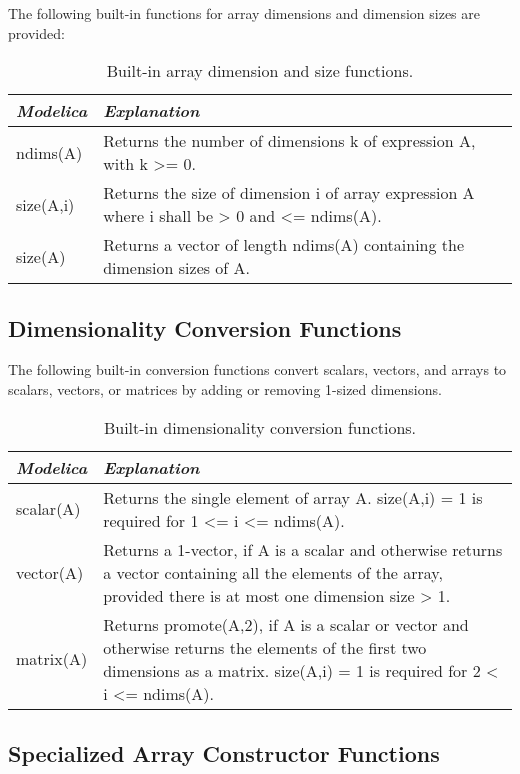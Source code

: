 The following built-in functions for array dimensions and dimension
sizes are provided:

\begin{longtable}[]{|l|p{9cm}|}
\caption{Built-in array dimension and size functions.}\\
\hline
\emph{Modelica} & \emph{Explanation}\\ \hline
\endhead
ndims(A) & 
Returns the number of dimensions k of expression A, with k
\textgreater{}= 0.
\\ \hline
size(A,i) &
Returns the size of dimension i of array expression A where i shall be
\textgreater{} 0 and \textless{}= ndims(A).\\ \hline
size(A) &
Returns a vector of length ndims(A) containing the dimension sizes of
A.\\ \hline
\end{longtable}

\subsection{Dimensionality Conversion Functions}

The following built-in conversion functions convert scalars, vectors,
and arrays to scalars, vectors, or matrices by adding or removing
1-sized dimensions.

\begin{longtable}[]{|l|p{9cm}|}
\caption{Built-in dimensionality conversion functions.}\\
\hline
\emph{Modelica} & \emph{Explanation}\\ \hline
\endhead
scalar(A) & Returns the single element of array A. size(A,i) = 1 is required for 1
\textless{}= i \textless{}= ndims(A).\\ \hline
vector(A)
& 
Returns a 1-vector, if A is a scalar and otherwise returns a vector
containing all the elements of the array, provided there is at most one
dimension size \textgreater{} 1.\\ \hline
matrix(A)
& 
Returns promote(A,2), if A is a scalar or vector and otherwise returns
the elements of the first two dimensions as a matrix. size(A,i) = 1 is
required for 2 \textless{} i \textless{}= ndims(A).\\ \hline
\end{longtable}

\subsection{Specialized Array Constructor Functions}

